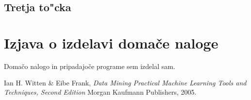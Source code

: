 \documentclass[a4paper,11pt]{article}
\begin{document}
\subsection{Tretja to"cka}

%


\section{Izjava o izdelavi domače naloge}
Domačo nalogo in pripadajoče programe sem izdelal sam.


\begin{thebibliography}{9}

   Ian H. Witten \& Eibe Frank,
   \emph{Data Mining Practical Machine Learning Tools and Techniques, Second Edition}
   Morgan Kaufmann Publishers,  
   2005.

\end{thebibliography}
\end{document}

